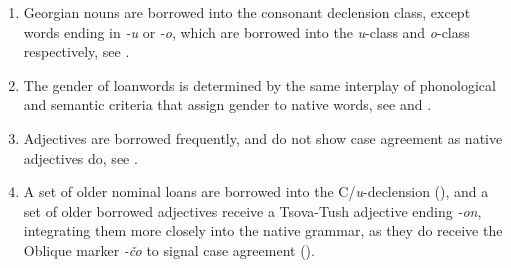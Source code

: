 \begin{enumerate}
	\item Georgian nouns are borrowed into the consonant declension class, except words ending in \textit{-u} or \textit{-o}, which are borrowed into the \textit{u}-class and \textit{o}-class respectively, see .
	
	\item The gender of loanwords is determined by the same interplay of phonological and semantic criteria that assign gender to native words, see  and \cite{WS}.
	
	\item Adjectives are borrowed frequently, and do not show case agreement as native adjectives do, see .
	
	\item A set of older nominal loans are borrowed into the C/\textit{u}-declension (), and a set of older borrowed adjectives receive a Tsova-Tush adjective ending \textit{-on}, integrating them more closely into the native grammar, as they do receive the Oblique marker \textit{-čo} to signal case agreement ().
\end{enumerate}
